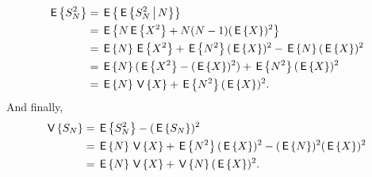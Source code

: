\begin{exercise}
\begin{solution}
\begin{equation*}
  \begin{split}
\E{ S_N^2}  &= \E{\E{ S_N^2 \given N}}  \\
&= \E{N \E{X^2} + N(N-1)(\E X)^2 } \\
& = \E N \E{ X^2} + \E{N^2} (\E X)^2 - \E N (\E X)^2 \\
& = \E N (\E{ X^2}  - (\E X)^2) + \E{N^2} (\E X)^2 \\
& = \E N \V X + \E{N^2} (\E X)^2.
  \end{split}
\end{equation*}
And finally,
\begin{equation}
  \begin{split}
  \V{S_N} 
&= \E{S_N^2}  - (\E{S_N})^2 \\
&= \E N \V X + \E{N^2} (\E X)^2   - (\E N)^2 (\E X)^2 \\
&= \E N \V X + \V N (\E X)^2.
  \end{split}
\end{equation}

\end{solution}
\end{exercise}


